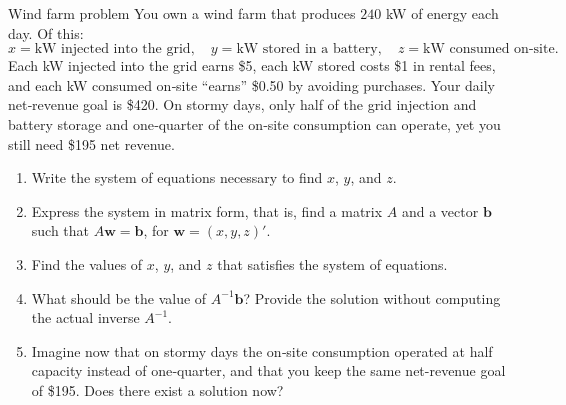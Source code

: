 \documentclass[9pt]{beamer}
\begin{document}
\begin{frame}{Wind farm problem}
    You own a wind farm that produces \(240\) kW of energy each day. Of this:
\[
x = \text{kW injected into the grid},\quad
y = \text{kW stored in a battery},\quad
z = \text{kW consumed on‑site}.
\]
Each kW injected into the grid earns \$5, each kW stored costs \$1 in rental fees, and each kW consumed on‑site “earns” \$0.50 by avoiding purchases.  Your daily net‑revenue goal is \$420.  On stormy days, only half of the grid injection and battery storage and one‑quarter of the on‑site consumption can operate, yet you still need \$195 net revenue.
\begin{enumerate}[leftmargin=0.5cm,label=(\alph*)]
  \item Write the system of equations necessary to find $x$, $y$, and $z$.
  \item Express the system in matrix form, that is, find a matrix $A$ and a vector $\pmb{b}$ such that $A\pmb{w} = \pmb{b}$, for $\pmb{w} = (x, y, z)'$.
  \item Find the values of $x$, $y$, and $z$ that satisfies the system of equations.
  \item What should be the value of $A^{-1}\pmb{b}$? Provide the solution without computing the actual inverse $A^{-1}$.
  \item Imagine now that on stormy days the on‑site consumption operated at half capacity instead of one‑quarter, and that you keep the same net-revenue goal of \$195. Does there exist a solution now?
\end{enumerate}
\end{frame}
\end{document}
